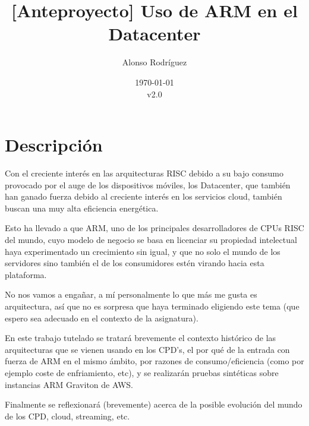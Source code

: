 \documentclass[a4paper,openright,12pt]{article}
\begin{document}
\author {Alonso Rodríguez}
\title {[Anteproyecto] Uso de ARM en el Datacenter}
\date {\today\\v2.0}

\maketitle

\justifying{}


\section{Descripción}\label{descr}
Con el creciente interés en las arquitecturas RISC debido a su bajo consumo provocado por el auge de los dispositivos móviles,
los Datacenter, que también han ganado fuerza debido al creciente interés en los servicios cloud, también buscan una muy alta eficiencia
energética.

Esto ha llevado a que ARM, uno de los principales desarrolladores de CPUs RISC del mundo, cuyo modelo de negocio se basa en licenciar su propiedad intelectual
haya experimentado un crecimiento sin igual, y que no solo el mundo de los servidores sino también el de los consumidores estén virando hacia esta plataforma.
\parencite{apple_m1_overview}

No nos vamos a engañar, a mí personalmente lo que más me gusta es arquitectura, así que no es sorpresa que haya terminado eligiendo este tema (que espero sea adecuado
en el contexto de la asignatura).

En este trabajo tutelado se tratará brevemente el contexto histórico de las arquitecturas que se vienen usando en los CPD's, el por qué de la entrada con fuerza de ARM en el
mismo ámbito, por razones de consumo/eficiencia (como por ejemplo coste de enfriamiento, etc), y se realizarán pruebas sintéticas sobre instancias ARM Graviton de AWS.\parencite{arm_aws_graviton_overview}

Finalmente se reflexionará (brevemente) acerca de la posible evolución del mundo de los CPD, cloud, streaming, etc.


\clearpage
\end{document}
